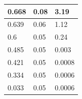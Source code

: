 \documentclass[a4paper,14pt]{article}
\begin{document}
\begin{table}[H]
\begin{tabular}{|l|l|l|}
			0.668                    & 0.08                    & 3.19                    \\ \hline
			0.639                    & 0.06                    & 1.12                    \\ \hline
			0.6                      & 0.05                    & 0.24                    \\ \hline
			0.485                    & 0.05                    & 0.003                   \\ \hline
			0.421                    & 0.05                    & 0.0008                  \\ \hline
			0.334                    & 0.05                    & 0.0006                  \\ \hline
			0.033                    & 0.05                    & 0.0006                  \\ \hline
		\end{tabular}
	\end{table}
\end{document}
